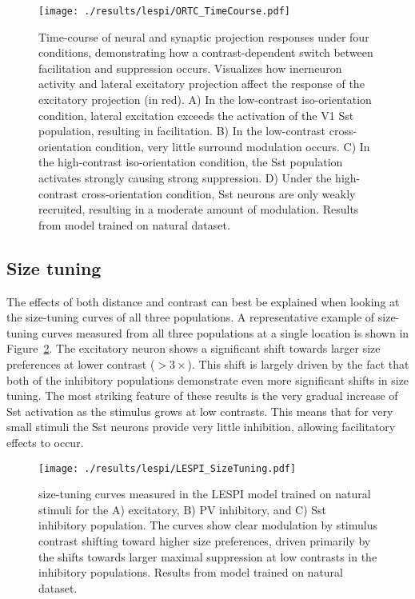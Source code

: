 \begin{figure}
	\centering
        \texttt{[image: ./results/lespi/ORTC\_TimeCourse.pdf]}
	\caption[Time-course of neural and synaptic projection responses
      under four conditions, demonstrating how a contrast-dependent
      switch between facilitation and suppression occurs]{Time-course
      of neural and synaptic projection responses under four
      conditions, demonstrating how a contrast-dependent switch
      between facilitation and suppression occurs. Visualizes how
      inerneuron activity and lateral excitatory projection affect the
      response of the excitatory projection (in red). A) In the
      low-contrast iso-orientation condition, lateral excitation
      exceeds the activation of the V1 Sst population, resulting in
      facilitation. B) In the low-contrast cross-orientation
      condition, very little surround modulation occurs. C) In the
      high-contrast iso-orientation condition, the Sst population
      activates strongly causing strong suppression. D) Under the
      high-contrast cross-orientation condition, Sst neurons are only
      weakly recruited, resulting in a moderate amount of modulation.
      Results from model trained on natural dataset.}
	\label{ORTC_TimeCourse}
\end{figure}

\subsection{Size tuning}

The effects of both distance and contrast can best be
explained when looking at the size-tuning curves of all three
populations. A representative example of size-tuning curves measured
from all three populations at a single location is shown in
Figure~\ref{LESPI_SizeTuning}. The excitatory neuron shows a
significant shift towards larger size preferences at lower contrast
($>3\times$). This shift is largely driven by the fact that both of
the inhibitory populations demonstrate even more significant shifts in size
tuning. The most striking feature of these results is the very gradual increase
of Sst activation as the stimulus grows at low contrasts. This means
that for very small stimuli the Sst neurons provide very little
inhibition, allowing facilitatory effects to occur.

\begin{figure}
	\centering
        \texttt{[image: ./results/lespi/LESPI\_SizeTuning.pdf]}
	\caption[size-tuning curves of the excitatory, PV, and Sst
      population at various contrasts.]{size-tuning curves measured in
      the LESPI model trained on natural stimuli for the A)
      excitatory, B) PV inhibitory, and C) Sst inhibitory
      population. The curves show clear modulation by stimulus
      contrast shifting toward higher size preferences, driven
      primarily by the shifts towards larger maximal suppression at
      low contrasts in the inhibitory populations. Results from model
      trained on natural dataset.}
	\label{LESPI_SizeTuning}
\end{figure}


